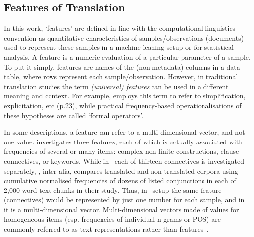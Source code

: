 \subsection{\label{ssec:feats}Features of Translation}
In this work, `features' are defined in line with the computational linguistics convention as quantitative characteristics of samples/observations (documents) used to represent these samples in a machine leaning setup or for statistical analysis. A feature is a numeric evaluation of a particular parameter of a sample. To put it simply, features are names of the (non-metadata) columns in a data table, where rows represent each sample/observation.
However, in traditional translation studies the term \textit{(universal) features} can be used in a different meaning and context. For example, \citet{Zanettin2013} employs this term to refer to simplification, explicitation, etc (p.23), while practical frequency-based operationalisations of these hypotheses are called `formal operators'. 


In some descriptions, a feature can refer to a multi-dimensional vector, and not one value. \citet{Puurtinen2003} investigates three features, each of which is actually associated with frequencies of several or many items: complex non-finite constructions, clause connectives, or keywords. While in~\citet{Puurtinen2003} each of thirteen connectives is investigated separately, \citet{Xiao2010}, inter alia, compares translated and non-translated corpora using cumulative normalised frequencies of dozens of listed conjunctions in each of 2,000-word text chunks in their study. Thus, in~\citet{Xiao2010} setup the same feature (connectives) would be represented by just one number for each sample, and in~\citet{Puurtinen2003} it is a multi-dimensional vector.
Multi-dimensional vectors made of values for homogeneous items (esp. frequencies of individual n-grams or POS) are commonly referred to as text representations rather than features~\cite[see usage in ][]{Baroni2005,Kurokawa2009}. 

